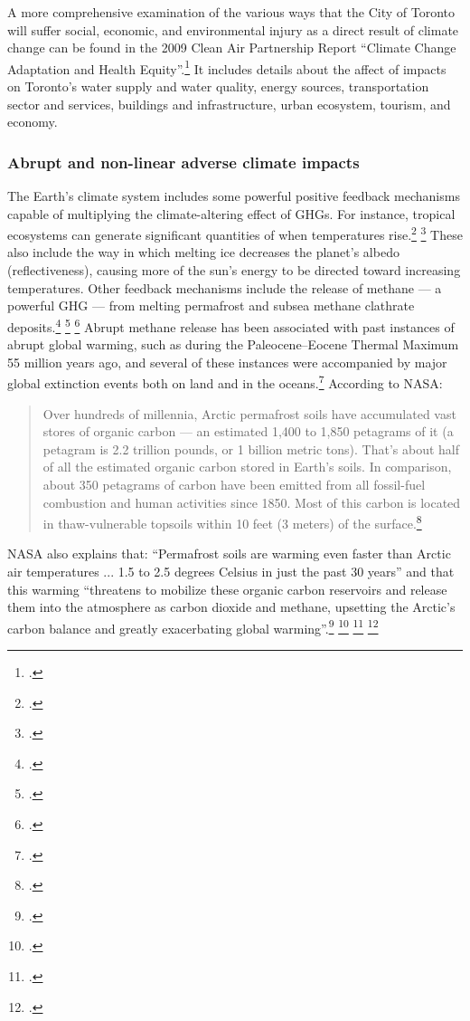 A more comprehensive examination of the various ways that the City of Toronto will suffer social, economic, and environmental injury as a direct result of climate change can be found in the 2009 Clean Air Partnership Report ``Climate Change Adaptation and Health Equity''.\footcite[][]{CCAHealthEquity}
It includes details about the affect of impacts on Toronto's water supply and water quality, energy sources, transportation sector and services, buildings and infrastructure, urban ecosystem, tourism, and economy.  



	\subsubsection{Abrupt and non-linear adverse climate impacts}



The Earth's climate system includes some powerful positive feedback mechanisms capable of multiplying the climate-altering effect of GHGs.
For instance, tropical ecosystems can generate significant quantities of  when temperatures rise.\footcite[][]{Wang2013} \footcite[See also: ][]{TropicalEcoBoost}
These also include the way in which melting ice decreases the planet's albedo (reflectiveness), causing more of the sun's energy to be directed toward increasing temperatures.
Other feedback mechanisms include the release of methane --- a powerful GHG --- from melting permafrost and subsea methane clathrate deposits.\footcite[See: ][]{VastCostsArctic} \footcite[See also: ][]{Thermokast2013} \footcite[See also: ][]{VidalTimebomb}
Abrupt methane release has been associated with past instances of abrupt global warming, such as during the Paleocene–Eocene Thermal Maximum 55 million years ago, and several of these instances were accompanied by major global extinction events both on land and in the oceans.\footcite[See: ][]{Hansen2010}
According to NASA:
\begin{quote}
Over hundreds of millennia, Arctic permafrost soils have accumulated vast stores of organic carbon --- an estimated 1,400 to 1,850 petagrams of it (a petagram is 2.2 trillion pounds, or 1 billion metric tons). That's about half of all the estimated organic carbon stored in Earth's soils. In comparison, about 350 petagrams of carbon have been emitted from all fossil-fuel combustion and human activities since 1850. Most of this carbon is located in thaw-vulnerable topsoils within 10 feet (3 meters) of the surface.\footcite[][]{SleepingGiant}
\end{quote}
NASA also explains that: ``Permafrost soils are warming even faster than Arctic air temperatures ... 1.5 to 2.5 degrees Celsius in just the past 30 years'' and that this warming ``threatens to mobilize these organic carbon reservoirs and release them into the atmosphere as carbon dioxide and methane, upsetting the Arctic's carbon balance and greatly exacerbating global warming''.\footcite[][]{SleepingGiant} \footcite[See also: ][p. 183--6]{Vaks2013} \footcite[][]{15permafrost} \footcite[][]{Bakewell2013}




